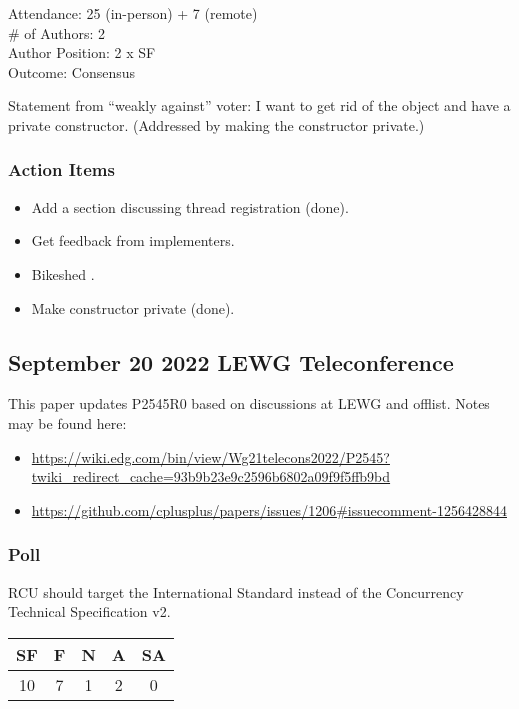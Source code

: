 Attendance: 25 (in-person) + 7 (remote) \\
\# of Authors: 2 \\
Author Position: 2 x SF \\
Outcome: Consensus

Statement from ``weakly against'' voter: I want to get rid of the object
and have a private constructor.
(Addressed by making the constructor private.)

\subsubsection{Action Items}
\label{sec:kona2022:Action Items}

\begin{itemize}
\item	Add a section discussing thread registration (done).
\item	Get feedback from implementers.
\item	Bikeshed .
\item	Make  constructor private (done).
\end{itemize}

\subsection{September 20 2022 LEWG Teleconference}
\label{sec:September 20 2022 LEWG Teleconference}

This paper updates P2545R0 based on discussions at LEWG and offlist.
Notes may be found here:

\begin{itemize}
\item	\url{https://wiki.edg.com/bin/view/Wg21telecons2022/P2545?twiki_redirect_cache=93b9b23e9c2596b6802a09f9f5ffb9bd}
\item	\url{https://github.com/cplusplus/papers/issues/1206#issuecomment-1256428844}
\end{itemize}

\subsubsection{Poll}
\label{sec:LEWG-2022-09-20:Poll}

RCU should target the International Standard instead of the Concurrency Technical Specification v2.

\begin{tabular}{c|c|c|c|c}
SF & F &  N & A & SA \\
\hline
10 & 7 &  1 & 2 &  0 \\
\end{tabular}

